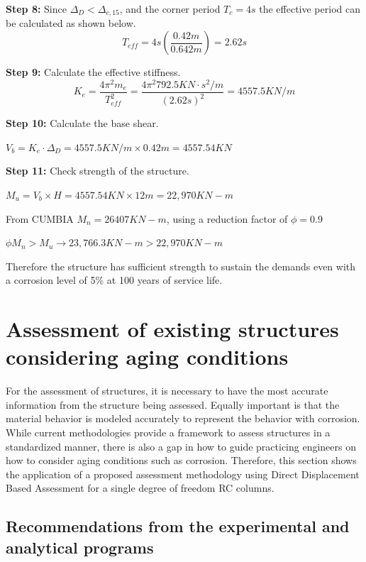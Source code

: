 \textbf{Step 8:} Since $\Delta_{D}<\Delta_{c,15}$, and the corner period $T_{c}=4s$ the effective period can be calculated as shown below.
\begin{displaymath}
    T_{eff}=4s \left(\frac{0.42m}{0.642m}\right)=2.62s
\end{displaymath}

\textbf{Step 9:} Calculate the effective stiffness.
\begin{displaymath}
    K_{e}=\frac{4\pi^2m_{e}}{T_{eff}^2}=\frac{4\pi^2 792.5 KN\cdot s^2/m}{(2.62s)^2}=4557.5 KN/m
\end{displaymath}

\textbf{Step 10:} Calculate the base shear.

$\displaystyle V_{b}=K_{e} \cdot \Delta_{D}= 4557.5 KN/m \times 0.42m = 4557.54 KN$

\textbf{Step 11:} Check strength of the structure.

$M_{u}=V_{b} \times H=4557.54 KN \times 12m = 22,970 KN-m$

From CUMBIA $M_{n} = 26407 KN-m$, using a reduction factor of $\phi=0.9$

$\phi M_{n}>M_{u} \to 23,766.3 KN-m > 22,970 KN-m$

Therefore the structure has sufficient strength to sustain the demands even with a corrosion level of 5\% at 100 years of service life.

\section{Assessment of existing structures considering aging conditions}
For the assessment of structures, it is necessary to have the most accurate information from the structure being assessed. Equally important is that the material behavior is modeled accurately to represent the behavior with corrosion. While current methodologies provide a framework to assess structures in a standardized manner, there is also a gap in how to guide practicing engineers on how to consider aging conditions such as corrosion. Therefore, this section shows the application of a proposed assessment methodology using Direct Displacement Based Assessment for a single degree of freedom RC columns. 

\subsection{Recommendations from the experimental and analytical programs}

